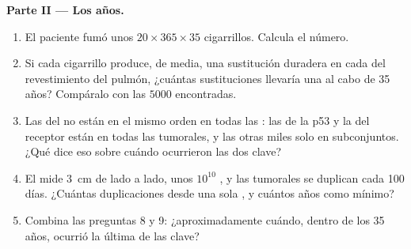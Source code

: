 \begin{problem}
\medskip
\noindent\textbf{Parte II --- Los años.}
\begin{enumerate}[resume]
  \item El paciente fumó unos $20 \times 365 \times 35$ cigarrillos.
        Calcula el número.
  \item Si cada cigarrillo produce, de media, una sustitución duradera
        en cada  del revestimiento del pulmón, ¿cuántas
        sustituciones llevaría una  al cabo de 35 años?
        Compáralo con las $\num{5000}$ encontradas.
  \item Las  del  no están en el mismo orden en todas
        las : las de la p53 y la del receptor están en todas las
         tumorales, y las otras miles solo en subconjuntos. ¿Qué
        dice eso sobre cuándo ocurrieron las dos  clave?
  \item El  mide \qty{3}{cm} de lado a lado, unos $10^{10}$
        , y las  tumorales se duplican cada 100 días.
        ¿Cuántas duplicaciones desde una sola , y cuántos años
        como mínimo?
  \item Combina las preguntas 8 y 9: ¿aproximadamente cuándo, dentro de
        los 35 años, ocurrió la última de las  clave?
\end{enumerate}


\end{problem}
